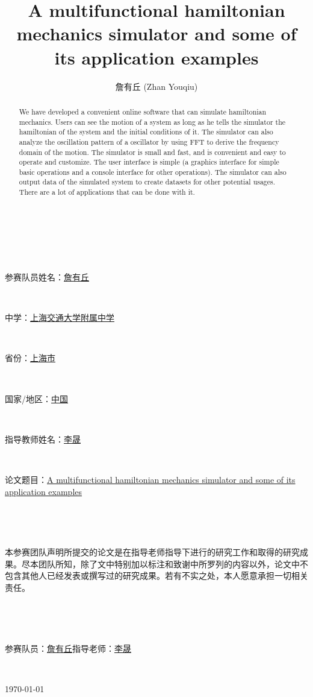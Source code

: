 \documentclass[12pt]{article}
\title{A multifunctional hamiltonian mechanics simulator and some of its application examples}
\author{詹有丘 (Zhan Youqiu)}
\begin{document}
\Huge

~\par
~\par
\noindent 参赛队员姓名：\underline{詹有丘}\par
~\par
\noindent 中学：\underline{上海交通大学附属中学}\par
~\par
\noindent 省份：\underline{上海市}\par
~\par
\noindent 国家/地区：\underline{中国}\par
~\par
\noindent 指导教师姓名：\underline{李晟}\par
~\par
\noindent 论文题目：\ul{A multifunctional hamiltonian mechanics simulator and some of its application examples}

\newpage

\huge

~\par
~\par
\setlength{\parindent}{5ex}
本参赛团队声明所提交的论文是在指导老师指导下进行的研究工作和取得的研究成果。尽本团队所知，除了文中特别加以标注和致谢中所罗列的内容以外，论文中不包含其他人已经发表或撰写过的研究成果。若有不实之处，本人愿意承担一切相关责任。\par
~\par
~\par
参赛队员：\underline{詹有丘}\qquad 指导老师：\underline{李晟}\par
~\par
\begin{flushright}\chinesedate\today\end{flushright}

\normalsize

\setlength{\parindent}{1.5em}

\maketitle

\begin{abstract}
We have developed a convenient online software that can simulate hamiltonian mechanics.
Users can see the motion of a system as long as he tells the simulator
the hamiltonian of the system and the initial conditions of it.
The simulator can also analyze the oscillation pattern of a oscillator
by using FFT to derive the frequency domain of the motion.
The simulator is small and fast, and is convenient and easy to operate and customize.
The user interface is simple (a graphics interface for simple basic operations
and a console interface for other operations).
The simulator can also output data of the simulated system to create datasets
for other potential usages.
There are a lot of applications that can be done with it.
\end{abstract}
\end{document}
